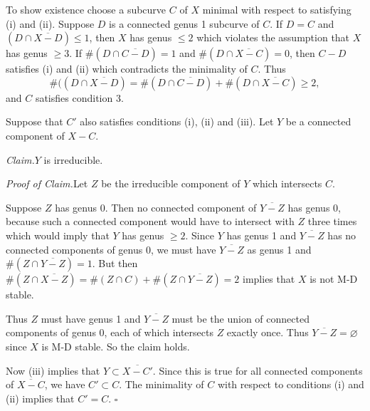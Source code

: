 \documentclass[12pt]{memoir}
\begin{document}
\begin{ptcbp}
To show existence choose a subcurve $C$ of $X$ minimal with respect to satisfying (i) and (ii). Suppose $D$ is a connected genus 1 subcurve of $C$. If $D = C$ and $(D \cap \overline{X - D}) \leqslant 1$, then $X$ has genus $\leqslant 2$ which violates the assumption that $X$ has genus $\geqslant 3$. If $\#(D \cap \overline{C - D}) = 1$ and $\#(D \cap \overline{X - C}) = 0$, then $C - D$ satisfies (i) and (ii) which contradicts the minimality of $C$. Thus
\[
\#((D \cap \overline{X - D}) = \#(D \cap \overline{C - D}) + \#(D \cap \overline{X - C}) \geqslant 2,
\]
and $C$ satisfies condition 3.

Suppose that $C'$ also satisfies conditions (i), (ii) and (iii). Let $Y$ be a connected component of $X - C$.

\emph{Claim.}\quad $Y$ is irreducible.

\emph{Proof of Claim.}\quad Let $Z$ be the irreducible component of $Y$ which intersects $C$.

Suppose $Z$ has genus 0. Then no connected component of $\overline{Y - Z}$ has genus 0, because such a connected component would have to intersect with $Z$ three times which would imply that $Y$ has genus $\geqslant 2$. Since $Y$ has genus 1 and $\overline{Y - Z}$ has no connected components of genus 0, we must have $\overline{Y - Z}$ as genus 1 and $\#(Z \cap \overline{Y - Z}) = 1$. But then $\#(Z \cap \overline{X - Z}) = \#(Z \cap C) + \#(Z \cap \overline{Y - Z}) = 2$ implies that $X$ is not M-D stable.

Thus $Z$ must have genus 1 and $\overline{Y - Z}$ must be the union of connected components of genus 0, each of which intersects $Z$ exactly once. Thus $\overline{Y - Z} = \varnothing$ since $X$ is M-D stable. So the claim holds.

Now (iii) implies that $Y \subset \overline{X - C'}$. Since this is true for all connected components of $\overline{X - C}$, we have $C' \subset C$. The minimality of $C$ with respect to conditions (i) and (ii) implies that $C' = C$. \hfill$\square$
\end{ptcbp}

\end{document}
